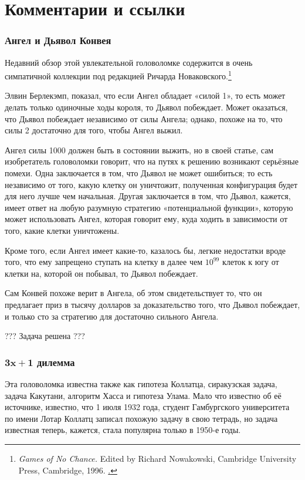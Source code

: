 \section*{Комментарии и ссылки}

\subsubsection*{Ангел и Дьявол Конвея}

Недавний обзор этой увлекательной головоломке содержится в очень симпатичной коллекции под редакцией Ричарда Новаковского.\footnote{\emph{Games of No Chance.} Edited by Richard Nowakowski, Cambridge University Press, Cambridge, 1996. \href{http://library.msri.org/books/Book29/}.} 

Элвин Берлекэмп,  показал, что если Ангел обладает «силой 1», то есть может делать только одиночные ходы короля, то Дьявол побеждает.
Может оказаться, что Дьявол побеждает независимо от силы Ангела; 
однако, похоже на то, что силы 2 достаточно для того, чтобы Ангел выжил.

Ангел силы 1000 должен быть в состоянии выжить, но в своей статье, сам изобретатель головоломки говорит, что на путях к решению возникают серьёзные помехи.
Одна заключается в том, что Дьявол не может ошибиться;
то есть независимо от того, какую клетку он уничтожит, полученная конфигурация будет для него лучше чем начальная.
Другая заключается в том, что Дьявол, кажется, имеет ответ на любую разумную стратегию «потенциальной функции», которую может использовать Ангел, которая говорит ему, куда ходить в зависимости от того, какие клетки уничтожены. %

Кроме того, если Ангел имеет какие-то, казалось бы, легкие недостатки вроде того, что ему запрещено ступать на клетку в далее чем $10^{99}$ клеток к югу от клетки на, которой он побывал, то Дьявол побеждает.

Сам Конвей похоже верит в Ангела, об этом свидетельствует то, что он предлагает приз в тысячу долларов за доказательство того, что Дьявол побеждает, и только сто за стратегию для достаточно сильного Ангела.

??? Задача решена ???

\subsubsection*{$\bm{3x+1}$ дилемма}

Эта головоломка известна также как гипотеза Коллатца, сиракузская задача, задача Какутани, алгоритм Хасса и гипотеза Улама.
Мало что известно об её источнике, известно, что 1 июля 1932 года, студент Гамбургского университета по имени Лотар Коллатц записал похожую задачу в свою тетрадь, но задача известная теперь, кажется, стала популярна только в 1950-е годы.

